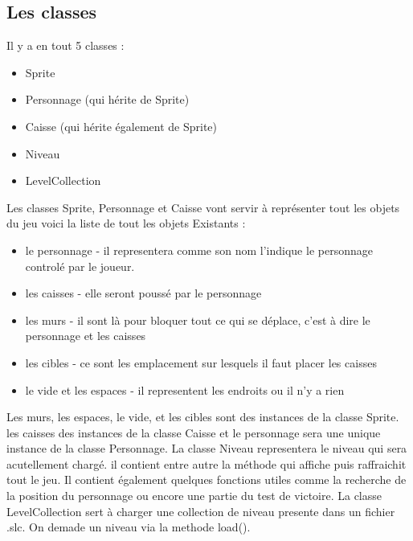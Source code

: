 \documentclass{article}
\begin{document}
	\subsection{Les classes}
	Il y a en tout 5 classes :
		\begin{itemize}
		 \item Sprite
		 \item Personnage (qui hérite de Sprite)
		 \item Caisse (qui hérite également de Sprite)
		 \item Niveau
		 \item LevelCollection
		\end{itemize}
	Les classes Sprite, Personnage et Caisse vont servir à représenter tout les objets du jeu voici la liste de tout les objets Existants :
		\begin{itemize}
		 \item le personnage - il representera comme son nom l'indique le personnage controlé par le joueur.
		 \item les caisses - elle seront poussé par le personnage
		 \item les murs - il sont là pour bloquer tout ce qui se déplace, c'est à dire le personnage et les caisses
		 \item les cibles - ce sont les emplacement sur lesquels il faut placer les caisses
		 \item le vide et les espaces - il representent les endroits ou il n'y a rien
		\end{itemize}
	Les murs, les espaces, le vide, et les cibles sont des instances de la classe Sprite. les caisses des instances de la classe Caisse et le personnage 
	sera une unique instance de la classe Personnage.
	\newline
	La classe Niveau representera le niveau qui sera acutellement chargé. il contient entre autre la méthode qui affiche puis raffraichit tout le jeu.
	Il contient également quelques fonctions utiles comme la recherche de la position du personnage ou encore une partie du test de victoire.
	\newline
	La classe LevelCollection sert à charger une collection de niveau presente dans un fichier .slc. On demade un niveau via la methode load().
\end{document}
